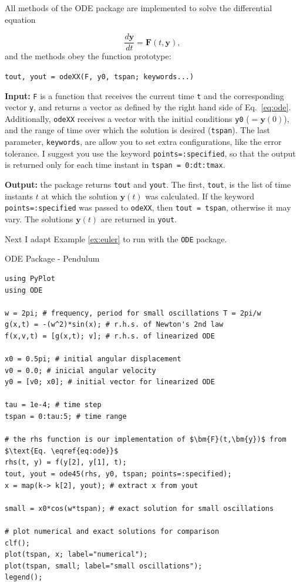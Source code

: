 All methods of the ODE package are implemented to solve the differential equation

\begin{equation}
 \dfrac{d \bm{y}}{dt} = \bm{F}(t, \bm{y}),
 \label{eq:ode}
\end{equation}
and the methods obey the function prototype:

\begin{center}
\texttt{tout, yout = odeXX(F, y0, tspan; keywords...)}
\end{center}

\textbf{Input:} \texttt{F} is a function that receives the current time \texttt{t} and the corresponding vector \texttt{y}, and returns a vector as defined by the right hand side of Eq.~\eqref{eq:ode}. Additionally, \texttt{odeXX} receives a vector with the initial conditions \texttt{y0} ($ = \bm{y}(0)$), and the range of time over which the solution is desired (\texttt{tspan}). The last parameter, \texttt{keywords}, are allow you to set extra configurations, like the error tolerance. I suggest you use the keyword \texttt{points=:specified}, so that the output is returned only for each time instant in \mbox{\texttt{tspan = 0:dt:tmax}}.

\textbf{Output:} the package returns \texttt{tout} and \texttt{yout}. The first, \texttt{tout}, is the list of time instants $t$ at which the solution $\bm{y}(t)$ was calculated. If the keyword \texttt{points=:specified} was passed to \texttt{odeXX}, then \texttt{tout = tspan}, otherwise it may vary. The solutions $\bm{y}(t)$ are returned in \texttt{yout}.

Next I adapt Example \ref{ex:euler} to run with the \texttt{ODE} package.

\begin{example}{ODE Package - Pendulum}
\label{ex:odependulum}
\begin{verbatim}
using PyPlot
using ODE

w = 2pi; # frequency, period for small oscillations T = 2pi/w
g(x,t) = -(w^2)*sin(x); # r.h.s. of Newton's 2nd law
f(x,v,t) = [g(x,t); v]; # r.h.s. of linearized ODE

x0 = 0.5pi; # initial angular displacement
v0 = 0.0; # inicial angular velocity
y0 = [v0; x0]; # initial vector for linearized ODE

tau = 1e-4; # time step
tspan = 0:tau:5; # time range

# the rhs function is our implementation of $\bm{F}(t,\bm{y})$ from $\text{Eq. \eqref{eq:ode}}$
rhs(t, y) = f(y[2], y[1], t);
tout, yout = ode45(rhs, y0, tspan; points=:specified);
x = map(k-> k[2], yout); # extract x from yout

small = x0*cos(w*tspan); # exact solution for small oscillations

# plot numerical and exact solutions for comparison
clf(); 
plot(tspan, x; label="numerical");
plot(tspan, small; label="small oscillations");
legend();
\end{verbatim}
\end{example}


